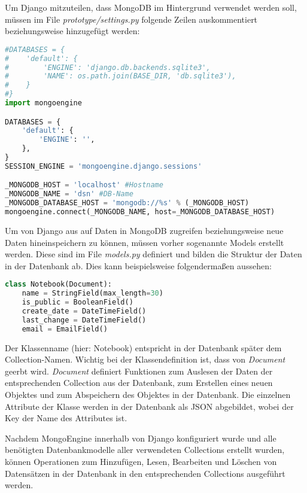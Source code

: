 \newpage

Um Django mitzuteilen, dass MongoDB im Hintergrund verwendet werden soll, müssen im File \textit{prototype/settings.py} folgende Zeilen auskommentiert beziehungsweise hinzugefügt werden:

\begin{lstlisting}[caption=MongoDB Konfiguration in Django, language=Python]
#DATABASES = {
#    'default': {
#        'ENGINE': 'django.db.backends.sqlite3',
#        'NAME': os.path.join(BASE_DIR, 'db.sqlite3'),
#    }
#}
import mongoengine

DATABASES = {
    'default': {
        'ENGINE': '',
    },
}
SESSION_ENGINE = 'mongoengine.django.sessions'

_MONGODB_HOST = 'localhost' #Hostname
_MONGODB_NAME = 'dsn' #DB-Name
_MONGODB_DATABASE_HOST = 'mongodb://%s' % (_MONGODB_HOST)
mongoengine.connect(_MONGODB_NAME, host=_MONGODB_DATABASE_HOST)
\end{lstlisting}

Um von Django aus auf Daten in MongoDB zugreifen beziehungsweise neue Daten hineinspeichern zu können, müssen vorher sogenannte Models erstellt werden. Diese sind im File \textit{models.py} definiert und bilden die Struktur der Daten in der Datenbank ab. Dies kann beispielsweise folgendermaßen aussehen:

\begin{lstlisting}[caption=Beispiel für ein Datenbankmodell in Django, language=Python]
class Notebook(Document):
    name = StringField(max_length=30)
    is_public = BooleanField()
    create_date = DateTimeField()
    last_change = DateTimeField()
    email = EmailField()
\end{lstlisting}

Der Klassenname (hier: Notebook) entspricht in der Datenbank später dem Collection-Namen. Wichtig bei der Klassendefinition ist, dass von \textit{Document} geerbt wird. \textit{Document} definiert Funktionen zum Auslesen der Daten der entsprechenden Collection aus der Datenbank, zum Erstellen eines neuen Objektes und zum Abspeichern des Objektes in der Datenbank. Die einzelnen Attribute der Klasse werden in der Datenbank als JSON abgebildet, wobei der Key der Name des Attributes ist.

Nachdem MongoEngine innerhalb von Django konfiguriert wurde und alle benötigten Datenbankmodelle aller verwendeten Collections erstellt wurden, können Operationen zum Hinzufügen, Lesen, Bearbeiten und Löschen von Datensätzen in der Datenbank in den entsprechenden Collections ausgeführt werden.

